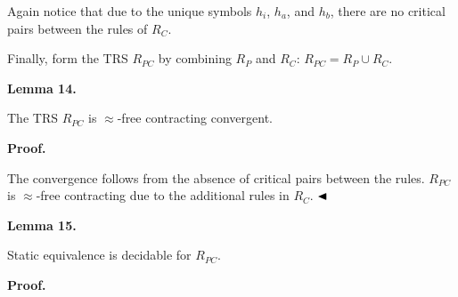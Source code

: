 \documentclass[10pt,a4paper]{amsart}
\begin{document}
 
Again notice that due to the unique symbols $h_{i}$, $h_{a}$, and $h_{b}$, there are no critical pairs between the rules of $R_{C}$.\par
 
 
 
Finally, form the TRS $R_{PC}$ by combining $R_{P}$ and $R_{C}$: $R_{PC}=R_{P}\cup R_{C}$.\par
 
 
 
\par\medskip\noindent\textbf{Lemma 14.}\par
 
 
The TRS $R_{PC}$ is $\approx$-free contracting convergent.\par
 
 
 
 
\par\medskip\noindent\textbf{Proof.}\par
 
 
The convergence follows from the absence of critical pairs between the rules. $R_{PC}$ is $\approx$-free contracting due to the additional rules in $R_{C}$. $\hfill\blacktriangleleft$\par
 
 
 
\par\medskip\noindent\textbf{Lemma 15.}\par
 
 
Static equivalence is decidable for $R_{PC}$.\par
 
 
 
 
 
\par\medskip\noindent\textbf{Proof.}\par
 
\end{document}
